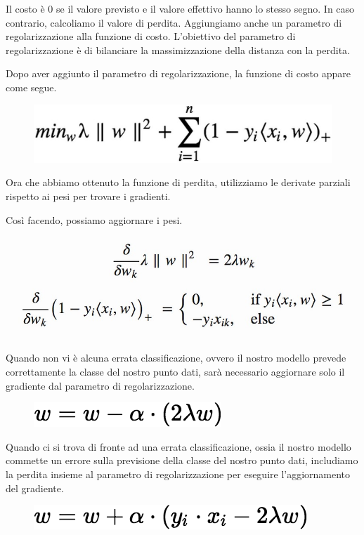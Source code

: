 Il costo è 0 se il valore previsto e il valore eﬀettivo hanno lo stesso segno. In caso contrario, calcoliamo il valore di perdita. Aggiungiamo anche un parametro di regolarizzazione alla funzione di costo. L'obiettivo del
parametro di regolarizzazione è di bilanciare la massimizzazione della distanza con la perdita. 

Dopo aver aggiunto il parametro di regolarizzazione, la funzione di costo appare come segue.
\begin{figure}
    \begin{center}    
        \includegraphics[width=0.9\linewidth]{images/image31.jpeg}
    \end{center}
\end{figure}

Ora che abbiamo ottenuto la funzione di perdita, utilizziamo le derivate parziali rispetto ai pesi per trovare i gradienti. 

Così facendo, possiamo aggiornare i pesi.
\begin{center}    
    \includegraphics[width=0.9\linewidth]{images/image32.jpeg}
\end{center}

Quando non vi è alcuna errata classificazione, ovvero il nostro modello prevede correttamente la classe del nostro punto dati, sarà necessario aggiornare solo il gradiente dal parametro di regolarizzazione.
\begin{figure}
    \begin{center}    
        \includegraphics[width=0.5\linewidth]{images/image33.png}
    \end{center}
\end{figure}

Quando ci si trova di fronte ad una errata classificazione, ossia il nostro modello commette un errore sulla previsione della classe del nostro punto dati, includiamo la perdita insieme al parametro di regolarizzazione per eseguire l'aggiornamento del gradiente.
\begin{figure}
    \begin{center}    
        \includegraphics[width=0.5\linewidth]{images/image34.png}
    \end{center}
\end{figure}

